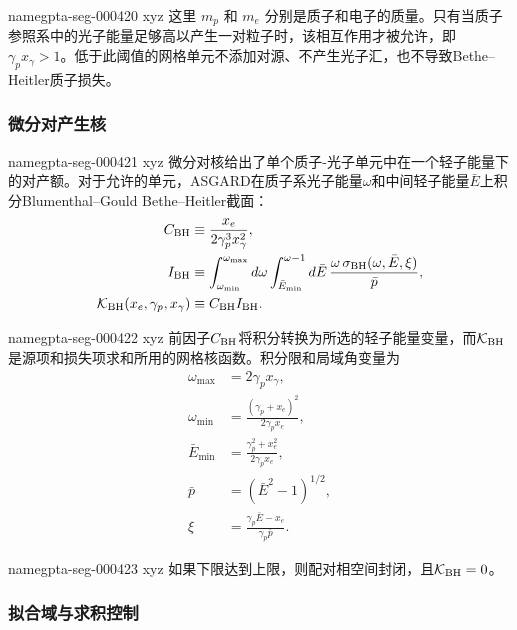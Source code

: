 \documentclass[twocolumn]{aastex702}
\makeatletter
\providecommand{\gptareaderanchor}[1]{\pdfdest name{#1} xyz}%
\providecommand{\gptareaderanchor}[1]{\special{pdf:dest (#1) [ @thispage /XYZ @xpos @ypos null ]}}%
\makeatother
\begin{document}
\gptareaderanchor{gpta-seg-000420}%
这里 \(m_p\) 和 \(m_e\) 分别是质子和电子的质量。只有当质子参照系中的光子能量足够高以产生一对粒子时，该相互作用才被允许，即 \(\gamma_p x_\gamma > 1\)。低于此阈值的网格单元不添加对源、不产生光子汇，也不导致Bethe--Heitler质子损失。

\subsubsection{微分对产生核}


\gptareaderanchor{gpta-seg-000421}%
微分对核给出了单个质子-光子单元中在一个轻子能量下的对产额。对于允许的单元，ASGARD在质子系光子能量\(\omega\)和中间轻子能量\(\bar E\)上积分Blumenthal–Gould Bethe–Heitler截面\citep{BlumenthalGould1970}：
\begin{equation}
\begin{aligned}
C_{\rm BH}&\equiv \frac{x_e}{2\gamma_p^3x_\gamma^2},\\
I_{\rm BH}
&\equiv \int_{\omega_{\min}}^{\omega_{\max}} d\omega
\int_{\bar E_{\min}}^{\omega-1} d\bar E\,
\frac{\omega\,\sigma_{\rm BH}(\omega,\bar E,\xi)}{\bar p},\\
\mathcal{K}_{\rm BH}(x_e,\gamma_p,x_\gamma)
&\equiv C_{\rm BH}I_{\rm BH}.
\end{aligned}
\end{equation}

\gptareaderanchor{gpta-seg-000422}%
前因子\(C_{\rm BH}\)将积分转换为所选的轻子能量变量，而\(\mathcal{K}_{\rm BH}\)是源项和损失项求和所用的网格核函数。积分限和局域角变量为
\begin{equation}
\begin{aligned}
\omega_{\max}&=2\gamma_px_\gamma,\\
\omega_{\min}&=\frac{(\gamma_p+x_e)^2}{2\gamma_px_e},\\
\bar E_{\min}&=\frac{\gamma_p^2+x_e^2}{2\gamma_px_e},\\
\bar p&=(\bar E^2-1)^{1/2},\\
\xi&=\frac{\gamma_p\bar E-x_e}{\gamma_p\bar p}.
\end{aligned}
\end{equation}

\gptareaderanchor{gpta-seg-000423}%
如果下限达到上限，则配对相空间封闭，且\(\mathcal{K}_{\rm BH}=0\)。

\subsubsection{拟合域与求积控制}
\end{document}
